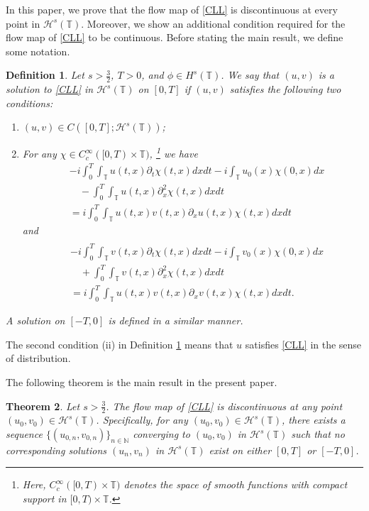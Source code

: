 \documentclass[%
11pt,  reqno]{amsart}
\newtheorem{theorem}{Theorem} [section]
\newtheorem{definition}[theorem]{Definition}
\newcommand{\T}{\mathbb{T}}
\newcommand{\N}{\mathbb{N}}
\renewcommand{\H}{\mathcal H}
\newcommand{\dx}{\partial_x}
\newcommand{\dt}{\partial_t}
\numberwithin{equation}{section}
\numberwithin{theorem}{section}
\let\Im=\undefined\DeclareMathOperator*{\Im}{Im}
\begin{document}
In this paper, 
we prove that the flow map of \eqref{CLL} is discontinuous at every point in $\H^s(\T)$.
Moreover, 
we show an additional condition required for the flow map of \eqref{CLL} to be continuous. 
Before stating the main result, we define some notation.
\begin{definition}
\label{def:sol}
Let $s>\frac 32$, $T > 0$, and $\phi \in H^s(\T)$.
We say that $(u,v)$ is a solution to \eqref{CLL} in $\H^s(\T)$ on $[0,T]$
if $(u,v)$ satisfies the following two conditions:

\begin{enumerate}
\item
$(u,v) \in C ([0,T]; \H^s(\T))$;

\item
For any $\chi \in C_c^\infty([0,T) \times \T)$,%
\footnote{Here, $C_c^\infty([0,T) \times \T)$ denotes the space of smooth functions with compact support in $[0,T) \times \T$.
}
we have
\begin{align*}
&- i \int_0^T \int_\T u (t,x) \dt \chi(t,x) dx dt
- i \int_\T u_0 (x) \chi (0,x) dx
\\
&\quad
- \int_0^T \int_\T u(t,x) \dx^2 \chi(t,x) dx dt
\\
&=
i \int_0^T \int_\T u(t,x) v(t,x) \dx u(t,x) \chi (t,x) dx dt
\end{align*}
and
\begin{align*}
\\
&- i \int_0^T \int_\T v (t,x) \dt \chi(t,x) dx dt
- i \int_\T v_0 (x) \chi (0,x) dx
\\
&\quad
+ \int_0^T \int_\T v(t,x) \dx^2 \chi(t,x) dx dt
\\
&=
i \int_0^T \int_\T u(t,x) v(t,x) \dx v(t,x) \chi (t,x) dx dt.
\end{align*}
\end{enumerate}
A solution on $[-T,0]$ is defined in a similar manner.
\end{definition}
The second condition (ii) in Definition \ref{def:sol} means that 
$u$ satisfies \eqref{CLL} in the sense of distribution.

The following theorem is the main result in the present paper.

\begin{theorem}
\label{thm:IP}
Let $s > \frac 32$. 
The flow map of \eqref{CLL} is discontinuous at any point $(u_0, v_0) \in \H^s(\T)$.
Specifically,
for any $(u_0, v_0) \in \H^s(\T)$, 
there exists a sequence $\{ (u_{0,n}, v_{0,n}) \}_{n \in \N}$ converging to $(u_0, v_0)$
in $\H^s(\T)$ such that no corresponding solutions $(u_n, v_n)$ in $\H^s(\T)$ 
exist on either $[0,T]$ or $[-T,0]$.
\end{theorem}
\end{document}
